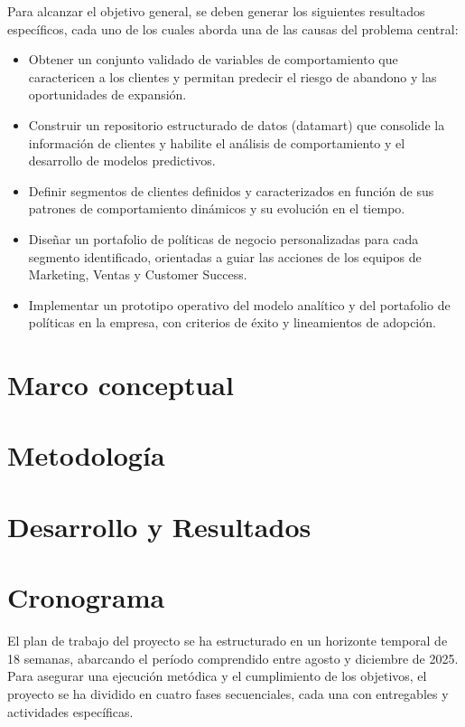 Para alcanzar el objetivo general, se deben generar los siguientes resultados específicos, cada uno de los cuales aborda una de las causas del problema central:

\begin{itemize}
    \item Obtener un conjunto validado de variables de comportamiento que caractericen a los clientes y permitan predecir el riesgo de abandono y las oportunidades de expansión.
    
    \item Construir un repositorio estructurado de datos (datamart) que consolide la información de clientes y habilite el análisis de comportamiento y el desarrollo de modelos predictivos.
    
    \item Definir segmentos de clientes definidos y caracterizados en función de sus patrones de comportamiento dinámicos y su evolución en el tiempo.
    
    \item Diseñar un portafolio de políticas de negocio personalizadas para cada segmento identificado, orientadas a guiar las acciones de los equipos de Marketing, Ventas y Customer Success.

    \item Implementar un prototipo operativo del modelo analítico y del portafolio de políticas en la empresa, con criterios de éxito y lineamientos de adopción.

\end{itemize}

\section{Marco conceptual}

\section{Metodología}

\section{Desarrollo y Resultados}

\section{Cronograma}
El plan de trabajo del proyecto se ha estructurado en un horizonte temporal de 18 semanas, abarcando el período comprendido entre agosto y diciembre de 2025. Para asegurar una ejecución metódica y el cumplimiento de los objetivos, el proyecto se ha dividido en cuatro fases secuenciales, cada una con entregables y actividades específicas.

